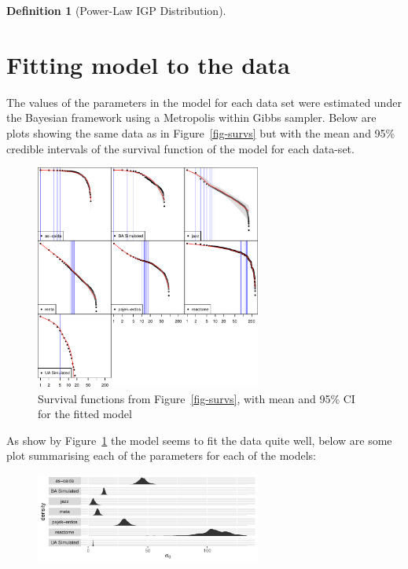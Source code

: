 \documentclass[
  10pt,
  a4paper,
]{scrreprt}
\theoremstyle{definition}
\newtheorem{definition}{Definition}[section]
\theoremstyle{plain}
\theoremstyle{plain}
\theoremstyle{plain}
\theoremstyle{remark}
\begin{document}
{\begin{definition}[Power-Law IGP
Distribution]
\end{definition}

\hypertarget{fitting-model-to-the-data}{%
\section{Fitting model to the data}\label{fitting-model-to-the-data}}

The values of the parameters in the model for each data set were
estimated under the Bayesian framework using a Metropolis within Gibbs
sampler. Below are plots showing the same data as in
Figure~\ref{fig-survs} but with the mean and 95\% credible intervals of
the survival function of the model for each data-set.

\begin{figure}[H]

{\centering \includegraphics[width=0.66\textwidth,height=\textheight]{doc_files/figure-pdf/fig-fits1-1.pdf}

}

\caption{\label{fig-fits1}Survival functions from
Figure~\ref{fig-survs}, with mean and 95\% CI for the fitted model}

\end{figure}

As show by Figure~\ref{fig-fits1} the model seems to fit the data quite
well, below are some plot summarising each of the parameters for each of
the models:

\begin{figure}[H]

{\centering \includegraphics[width=0.66\textwidth,height=\textheight]{doc_files/figure-pdf/fig-scale-1.pdf}

}
\end{figure}}
\end{document}
